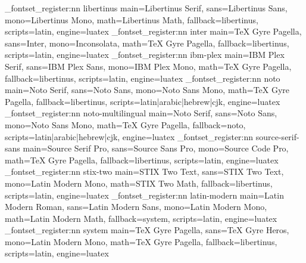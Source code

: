 \insr_fontset_register:nn { libertinus } { main=Libertinus Serif, sans=Libertinus Sans, mono=Libertinus Mono, math=Libertinus Math, fallback=libertinus, scripts=latin, engine=luatex }
\insr_fontset_register:nn { inter } { main=TeX Gyre Pagella, sans=Inter, mono=Inconsolata, math=TeX Gyre Pagella, fallback=libertinus, scripts=latin, engine=luatex }
\insr_fontset_register:nn { ibm-plex } { main=IBM Plex Serif, sans=IBM Plex Sans, mono=IBM Plex Mono, math=TeX Gyre Pagella, fallback=libertinus, scripts=latin, engine=luatex }
\insr_fontset_register:nn { noto } { main=Noto Serif, sans=Noto Sans, mono=Noto Sans Mono, math=TeX Gyre Pagella, fallback=libertinus, scripts=latin|arabic|hebrew|cjk, engine=luatex }
\insr_fontset_register:nn { noto-multilingual } { main=Noto Serif, sans=Noto Sans, mono=Noto Sans Mono, math=TeX Gyre Pagella, fallback=noto, scripts=latin|arabic|hebrew|cjk, engine=luatex }
\insr_fontset_register:nn { source-serif-sans } { main=Source Serif Pro, sans=Source Sans Pro, mono=Source Code Pro, math=TeX Gyre Pagella, fallback=libertinus, scripts=latin, engine=luatex }
\insr_fontset_register:nn { stix-two } { main=STIX Two Text, sans=STIX Two Text, mono=Latin Modern Mono, math=STIX Two Math, fallback=libertinus, scripts=latin, engine=luatex }
\insr_fontset_register:nn { latin-modern } { main=Latin Modern Roman, sans=Latin Modern Sans, mono=Latin Modern Mono, math=Latin Modern Math, fallback=system, scripts=latin, engine=luatex }
\insr_fontset_register:nn { system } { main=TeX Gyre Pagella, sans=TeX Gyre Heros, mono=Latin Modern Mono, math=TeX Gyre Pagella, fallback=libertinus, scripts=latin, engine=luatex }
